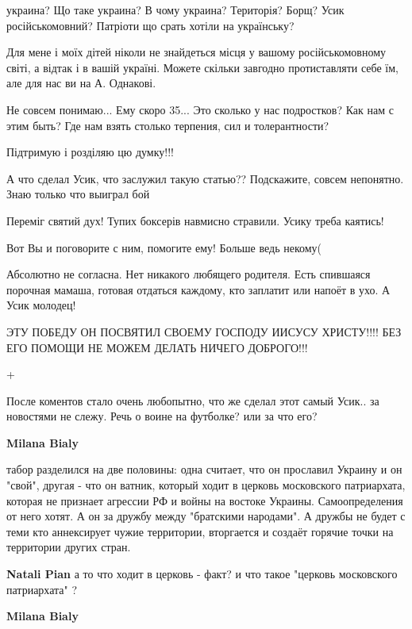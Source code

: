 \begin{itemize}
украина? Що таке украина? В чому украина? Територія? Борщ? Усик
російськомовний? Патріоти що срать хотіли на українську?

Для мене і моїх дітей ніколи не знайдеться місця у вашому російськомовному
світі, а відтак і в вашій україні. Можете скільки завгодно протиставляти себе
їм, але для нас ви на А. Однакові.


Не совсем понимаю... Ему скоро 35... Это сколько у нас подростков? Как нам с
этим быть? Где нам взять столько терпения, сил и толерантности?


Підтримую і розділяю цю думку!!!

А что сделал Усик, что заслужил такую статью?? Подскажите, совсем непонятно. Знаю только что выиграл бой

Переміг святий дух! Тупих боксерів навмисно стравили. Усику треба каятись!

Вот Вы и поговорите с ним, помогите ему! Больше ведь некому(

Абсолютно не согласна. Нет никакого любящего родителя. Есть спившаяся порочная мамаша, готовая отдаться каждому, кто заплатит или напоёт в ухо. А Усик молодец!

ЭТУ ПОБЕДУ ОН ПОСВЯТИЛ СВОЕМУ ГОСПОДУ ИИСУСУ ХРИСТУ!!!!
БЕЗ ЕГО ПОМОЩИ НЕ МОЖЕМ ДЕЛАТЬ НИЧЕГО ДОБРОГО!!!

+

После коментов стало очень любопытно, что же сделал этот самый Усик.. за новостями не слежу. Речь о воине на футболке? или за что его?


\begin{itemize} %
\textbf{Milana Bialy} 

табор разделился на две половины: одна считает, что он прославил Украину и он
"свой", другая - что он ватник, который ходит в церковь московского
патриархата, которая не признает агрессии РФ и войны на востоке Украины.
Самоопределения от него хотят. А он за дружбу между "братскими народами". А
дружбы не будет с теми кто аннексирует чужие территории, вторгается и создаёт
горячие точки на территории других стран.

\textbf{Natali Pian} а то что ходит в церковь - факт? и что такое "церковь московского патриархата" ?

\textbf{Milana Bialy} 


\end{itemize}
\end{itemize}

